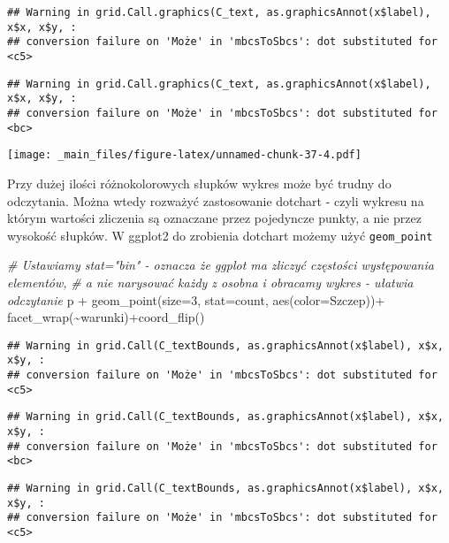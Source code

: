 \documentclass[
]{book}
\newenvironment{Shaded}{\begin{snugshade}}{\end{snugshade}}
\newcommand{\AttributeTok}[1]{\textcolor[rgb]{0.77,0.63,0.00}{#1}}
\newcommand{\CommentTok}[1]{\textcolor[rgb]{0.56,0.35,0.01}{\textit{#1}}}
\newcommand{\DecValTok}[1]{\textcolor[rgb]{0.00,0.00,0.81}{#1}}
\newcommand{\FunctionTok}[1]{\textcolor[rgb]{0.00,0.00,0.00}{#1}}
\newcommand{\NormalTok}[1]{#1}
\newcommand{\SpecialCharTok}[1]{\textcolor[rgb]{0.00,0.00,0.00}{#1}}
\newcommand{\StringTok}[1]{\textcolor[rgb]{0.31,0.60,0.02}{#1}}
\begin{document}
\begin{verbatim}
## Warning in grid.Call.graphics(C_text, as.graphicsAnnot(x$label), x$x, x$y, :
## conversion failure on 'Może' in 'mbcsToSbcs': dot substituted for <c5>
\end{verbatim}

\begin{verbatim}
## Warning in grid.Call.graphics(C_text, as.graphicsAnnot(x$label), x$x, x$y, :
## conversion failure on 'Może' in 'mbcsToSbcs': dot substituted for <bc>
\end{verbatim}

\texttt{[image: \_main\_files/figure-latex/unnamed-chunk-37-4.pdf]}

Przy dużej ilości różnokolorowych słupków wykres może być trudny do odczytania. Można wtedy rozważyć zastosowanie dotchart - czyli wykresu na którym wartości zliczenia są oznaczane przez pojedyncze punkty, a nie przez wysokość słupków. W ggplot2 do zrobienia dotchart możemy użyć \texttt{geom\_point}

\begin{Shaded}
\begin{Highlighting}[]
\CommentTok{\# Ustawiamy stat="bin" {-} oznacza że ggplot ma zliczyć częstości występowania elementów,}
\CommentTok{\# a nie narysować każdy z osobna i obracamy wykres {-} ułatwia odczytanie}
\NormalTok{p }\SpecialCharTok{+} \FunctionTok{geom\_point}\NormalTok{(}\AttributeTok{size=}\DecValTok{3}\NormalTok{, }\AttributeTok{stat=}\StringTok{\textquotesingle{}count\textquotesingle{}}\NormalTok{, }\FunctionTok{aes}\NormalTok{(}\AttributeTok{color=}\NormalTok{Szczep))}\SpecialCharTok{+}
  \FunctionTok{facet\_wrap}\NormalTok{(}\SpecialCharTok{\textasciitilde{}}\NormalTok{warunki)}\SpecialCharTok{+}\FunctionTok{coord\_flip}\NormalTok{()}
\end{Highlighting}
\end{Shaded}

\begin{verbatim}
## Warning in grid.Call(C_textBounds, as.graphicsAnnot(x$label), x$x, x$y, :
## conversion failure on 'Może' in 'mbcsToSbcs': dot substituted for <c5>
\end{verbatim}

\begin{verbatim}
## Warning in grid.Call(C_textBounds, as.graphicsAnnot(x$label), x$x, x$y, :
## conversion failure on 'Może' in 'mbcsToSbcs': dot substituted for <bc>
\end{verbatim}

\begin{verbatim}
## Warning in grid.Call(C_textBounds, as.graphicsAnnot(x$label), x$x, x$y, :
## conversion failure on 'Może' in 'mbcsToSbcs': dot substituted for <c5>
\end{verbatim}
\end{document}
